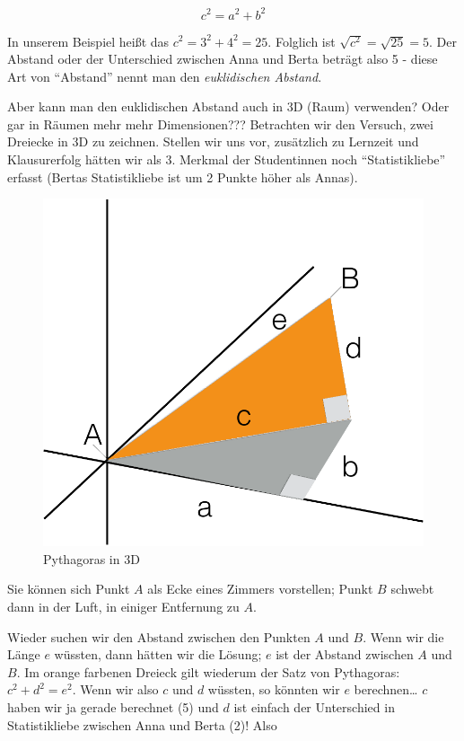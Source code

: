 \documentclass[12pt,ngerman,]{book}
\begin{document}
\[c^2 = a^2 + b^2\]

In unserem Beispiel heißt das \(c^2 = 3^2+4^2 = 25\). Folglich ist
\(\sqrt{c^2}=\sqrt{25}=5\). Der Abstand oder der Unterschied zwischen
Anna und Berta beträgt also 5 - diese Art von ``Abstand'' nennt man den
\emph{euklidischen Abstand}.

Aber kann man den euklidischen Abstand auch in 3D (Raum) verwenden? Oder
gar in Räumen mehr mehr Dimensionen??? Betrachten wir den Versuch, zwei
Dreiecke in 3D zu zeichnen. Stellen wir uns vor, zusätzlich zu Lernzeit
und Klausurerfolg hätten wir als 3. Merkmal der Studentinnen noch
``Statistikliebe'' erfasst (Bertas Statistikliebe ist um 2 Punkte höher
als Annas).

\begin{figure}

{\centering \includegraphics[width=0.7\linewidth]{images/cluster/pythagoras2_crop} 

}

\caption{Pythagoras in 3D}\label{fig:pythagoras2}
\end{figure}

Sie können sich Punkt \(A\) als Ecke eines Zimmers vorstellen; Punkt
\(B\) schwebt dann in der Luft, in einiger Entfernung zu \(A\).

Wieder suchen wir den Abstand zwischen den Punkten \(A\) und \(B\). Wenn
wir die Länge \(e\) wüssten, dann hätten wir die Lösung; \(e\) ist der
Abstand zwischen \(A\) und \(B\). Im orange farbenen Dreieck gilt
wiederum der Satz von Pythagoras: \(c^2+d^2=e^2\). Wenn wir also \(c\)
und \(d\) wüssten, so könnten wir \(e\) berechnen\ldots{} \(c\) haben
wir ja gerade berechnet (5) und \(d\) ist einfach der Unterschied in
Statistikliebe zwischen Anna und Berta (2)! Also
\end{document}
